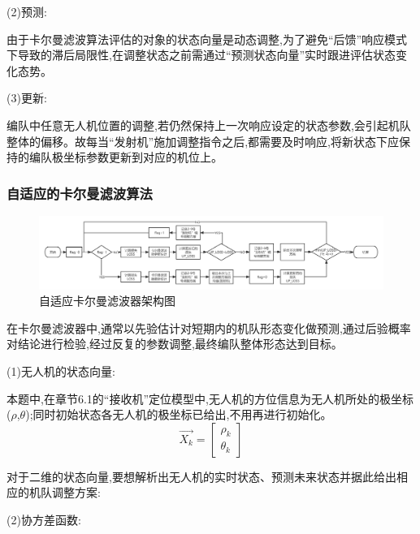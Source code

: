 \documentclass[withoutpreface,bwprint]{cumcmthesis} %
\begin{document}
    				(2)预测:
    					
    					由于卡尔曼滤波算法评估的对象的状态向量是动态调整,为了避免“后馈”响应模式下导致的滞后局限性,在调整状态之前需通过“预测状态向量”实时跟进评估状态变化态势。
	    				
    				
    				(3)更新:
    					
    					编队中任意无人机位置的调整,若仍然保持上一次响应设定的状态参数,会引起机队整体的偏移。故每当“发射机”施加调整指令之后,都需要及时响应,将新状态下应保持的编队极坐标参数更新到对应的机位上。
    				
    			\subsubsection{自适应的卡尔曼滤波算法}
    				
    					\begin{figure}[htbp!]
    						\includegraphics[width=16.5cm]{./figures/6-10.png}
    						\caption{自适应卡尔曼滤波器架构图}\label{fig:12}
    					\end{figure}
    					
    							在卡尔曼滤波器中,通常以先验估计对短期内的机队形态变化做预测,通过后验概率对结论进行检验,经过反复的参数调整,最终编队整体形态达到目标。
    				
    					(1)无人机的状态向量:
    						
    					本题中,在章节6.1的“接收机”定位模型中,无人机的方位信息为无人机所处的极坐标($\rho$,$\theta$);同时初始状态各无人机的极坐标已给出,不用再进行初始化。
    						\begin{equation}
    							\tag{6-3-1}
    							\vec{X_{k}} = \begin{bmatrix}
    								\rho_{k}\\
    								\theta_{k}
    								\end{bmatrix}
    						\end{equation}	
    		
    					 对于二维的状态向量,要想解析出无人机的实时状态、预测未来状态并据此给出相应的机队调整方案:
    					 
    					(2)协方差函数:
    						
\end{document}
